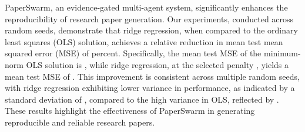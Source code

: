 PaperSwarm, an evidence-gated multi-agent system, significantly enhances the reproducibility of research paper generation. Our experiments, conducted across  random seeds, demonstrate that ridge regression, when compared to the ordinary least squares (OLS) solution, achieves a relative reduction in mean test mean squared error (MSE) of  percent. Specifically, the mean test MSE of the minimum-norm OLS solution is , while ridge regression, at the selected penalty , yields a mean test MSE of . This improvement is consistent across multiple random seeds, with ridge regression exhibiting lower variance in performance, as indicated by a standard deviation of , compared to the high variance in OLS, reflected by . These results highlight the effectiveness of PaperSwarm in generating reproducible and reliable research papers.
